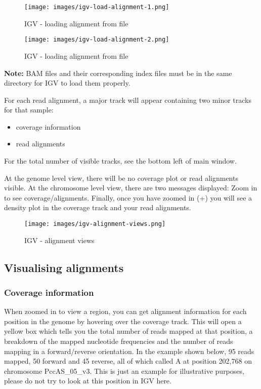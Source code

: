 \documentclass[11pt]{article}
\providecommand{\tightlist}{%
      \setlength{\itemsep}{0pt}\setlength{\parskip}{0pt}}
\begin{document}
    \begin{figure}
\centering
\texttt{[image: images/igv-load-alignment-1.png]}
\caption{IGV - loading alignment from file}
\end{figure}

    \begin{figure}
\centering
\texttt{[image: images/igv-load-alignment-2.png]}
\caption{IGV - loading alignment from file}
\end{figure}

    \textbf{Note:} BAM files and their corresponding index files must be in
the same directory for IGV to load them properly.

For each read alignment, a major track will appear containing two minor
tracks for that sample:

\begin{itemize}
\tightlist
\item
  coverage information
\item
  read alignments
\end{itemize}

For the total number of visible tracks, see the bottom left of main
window.

At the genome level view, there will be no coverage plot or read
alignments visible. At the chromosome level view, there are two messages
displayed: Zoom in to see coverage/alignments. Finally, once you have
zoomed in (+) you will see a density plot in the coverage track and your
read alignments.

    \begin{figure}
\centering
\texttt{[image: images/igv-alignment-views.png]}
\caption{IGV - alignment views}
\end{figure}

    \hypertarget{visualising-alignments}{%
\subsection{Visualising alignments}\label{visualising-alignments}}

\hypertarget{coverage-information}{%
\subsubsection{Coverage information}\label{coverage-information}}

When zoomed in to view a region, you can get alignment information for
each position in the genome by hovering over the coverage track. This
will open a yellow box which tells you the total number of reads mapped
at that position, a breakdown of the mapped nucleotide frequencies and
the number of reads mapping in a forward/reverse orientation. In the
example shown below, 95 reads mapped, 50 forward and 45 reverse, all of
which called A at position 202,768 on chromosome PccAS\_05\_v3. This is
just an example for illustrative purposes, please do not try to look at
this position in IGV here.
\end{document}
